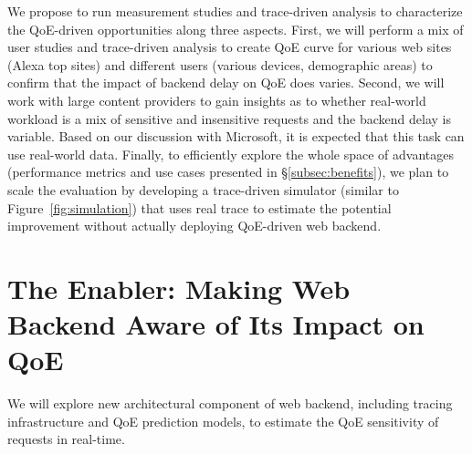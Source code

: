We propose to run measurement studies and trace-driven analysis to characterize the QoE-driven opportunities along three aspects.
First, we will perform a mix of user studies and trace-driven analysis to create QoE curve for various web sites (\eg Alexa top sites) and different users (\eg various devices, demographic areas) to confirm that the impact of backend delay on QoE does varies.
Second, we will work with large content providers to gain insights as to whether real-world workload is a mix of sensitive and insensitive requests and the backend delay is variable. 
Based on our discussion with Microsoft, it is expected that this task can use real-world data.
Finally, to efficiently explore the whole space of advantages (performance metrics and use cases presented in \S\ref{subsec:benefits}), we plan to scale the evaluation by developing a trace-driven simulator (similar to Figure~\ref{fig:simulation}) that uses real trace to estimate the potential improvement without actually deploying QoE-driven web backend.






\section{The Enabler: Making Web Backend Aware of Its Impact on QoE}
\label{sec:enabler}
\begin{task}
We will explore new architectural component of web backend, including tracing infrastructure and QoE prediction models, to estimate the QoE sensitivity of requests in real-time.
\end{task}



